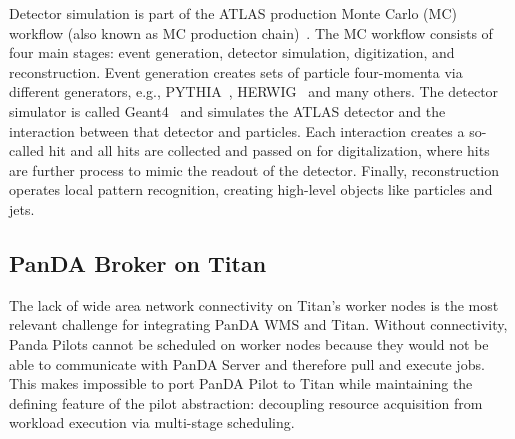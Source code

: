 Detector simulation is part of the ATLAS production Monte Carlo (MC) workflow
(also known as MC production
chain)~\cite{rimoldi2006atlas,de2013delphes,ritsch2014atlas}. The MC workflow
consists of four main stages: event generation, detector simulation,
digitization, and reconstruction. Event generation creates sets of particle
four-momenta via different generators, e.g., PYTHIA~\cite{sjostrand2006pythia},
HERWIG~\cite{corcella2001herwig} and many others.  The detector simulator is called
Geant4~\cite{agostinelli2003geant4} and simulates the ATLAS detector and the
interaction between that detector and particles.
Each interaction creates a so-called hit and all hits are collected and passed
on for digitalization, where hits are further process to mimic the readout of
the detector. Finally, reconstruction operates local pattern recognition,
creating high-level objects like particles and jets.



\subsection{PanDA Broker on Titan}
\label{ssec:panda_titan}

The lack of wide area network connectivity on Titan's worker nodes is the most
relevant challenge for integrating PanDA WMS and Titan. Without connectivity,
Panda Pilots cannot be scheduled on worker nodes because they would not be able
to communicate with PanDA Server and therefore pull and execute jobs. This makes
impossible to port PanDA Pilot to Titan while maintaining the defining feature
of the pilot abstraction: decoupling resource acquisition from workload
execution via multi-stage scheduling.

